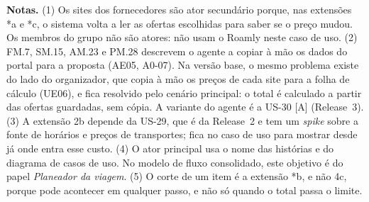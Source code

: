 \documentclass[11pt,a4paper]{article}
\newcommand{\reg}[1]{{\footnotesize\textcolor{pendente}{(#1)}}}
\begin{document}
\medskip
{\footnotesize\textbf{Notas.}
(1) Os sites dos fornecedores são ator secundário porque, nas extensões *a e *c, o sistema volta a ler as ofertas escolhidas para saber se o preço mudou. Os membros do grupo não são atores: não usam o Roamly neste caso de uso.
(2) FM.7, SM.15, AM.23 e PM.28 descrevem o agente a copiar à mão os dados do portal para a proposta \reg{AE05, A0-07}. Na versão base, o mesmo problema existe do lado do organizador, que copia à mão os preços de cada site para a folha de cálculo \reg{UE06}, e fica resolvido pelo cenário principal: o total é calculado a partir das ofertas guardadas, sem cópia. A variante do agente é a US-30 [A] (Release~3).
(3) A extensão 2b depende da US-29, que é da Release~2 e tem um \textit{spike} sobre a fonte de horários e preços de transportes; fica no caso de uso para mostrar desde já onde entra esse custo.
(4) O ator principal usa o nome das histórias e do diagrama de casos de uso. No modelo de fluxo consolidado, este objetivo é do papel \textit{Planeador da viagem}.
(5) O corte de um item é a extensão *b, e não 4c, porque pode acontecer em qualquer passo, e não só quando o total passa o limite.\par}
\end{document}
